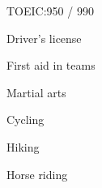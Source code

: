 \begin{SideBar}{\ColorBackground}{\ColorTextSide}
  \begin{ItemList}{\ColorHighlight}
    \item [\ding{226}] TOEIC:\@ 950 / 990
    \item [\ding{226}] Driver's license
    \item [\ding{226}] First aid in teams
  \end{ItemList}
  \vspace{0.5cm}

  \begin{multicols}{2}
    \begin{ItemList}{\ColorHighlight}
      \item Martial arts
      \item Cycling
      \item Hiking
      \item Horse riding
    \end{ItemList}
  \end{multicols}
\end{SideBar}